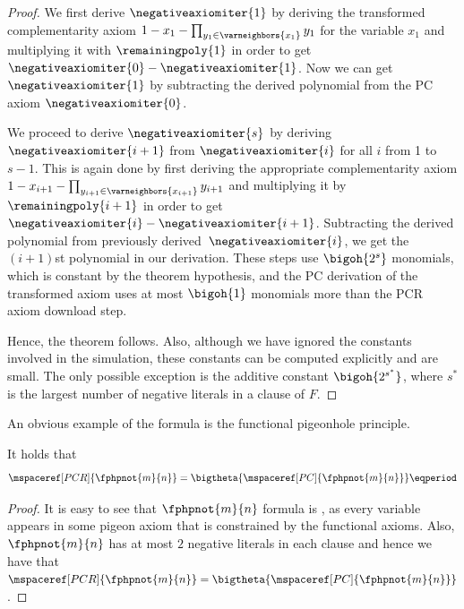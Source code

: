 \documentclass{toc}
\begin{document}
\begin{proof}
  We first derive $\negativeaxiomiter{1}$ by deriving the transformed
  complementarity axiom $1 - x_1 - \prod_{y_1 \in \varneighbors{x_1}}
  y_1$ for the variable $x_1$ and multiplying it with
  $\remainingpoly{1}$ in order to get
  $\negativeaxiomiter{0} - \negativeaxiomiter{1}$. Now we can get
  $\negativeaxiomiter{1}$ by subtracting the derived polynomial from
  the PC axiom $\negativeaxiomiter{0}$.


  We proceed to derive $\negativeaxiomiter{s}$ by deriving
  $\negativeaxiomiter{i + 1}$ from $\negativeaxiomiter{i}$ for all $i$
  from 1 to $s - 1$. This is again done by first deriving the
  appropriate complementarity axiom $1 - x_{i + 1} - \prod_{y_{i + 1}
    \in \varneighbors{x_{i + 1}}} y_{i + 1}$ and multiplying it by
  $\remainingpoly{i + 1}$ in order to get
  $\negativeaxiomiter{i} - \negativeaxiomiter{i + 1}$. Subtracting the
  derived polynomial from previously derived~$\negativeaxiomiter{i}$,
  we get the $(i + 1)$st polynomial in our derivation. These steps use
  $\bigoh{2^{s}}$ monomials, which is constant by the theorem hypothesis,
  and the PC derivation of the transformed axiom uses at most
  $\bigoh{1}$ monomials more than the PCR axiom download step.

  Hence, the theorem follows. Also, although we have ignored the
  constants involved in the simulation, these constants can be
  computed explicitly and are small. The only possible exception is
  the additive constant $\bigoh{2^{s^{*}}}$, where $s^{*}$ is the
  largest number of negative literals in a clause of $F$.
\end{proof}

An obvious example of the \varweightconstrained{} formula is the
functional pigeonhole principle.

\begin{corollary}\label{cor:fphppcequalpcrspace}
  It holds that
  \begin{equation*}
    \mspaceref[PCR]{\fphpnot{m}{n}} = \bigtheta{\mspaceref[PC]{\fphpnot{m}{n}}} \eqperiod
  \end{equation*}
\end{corollary}
\begin{proof}
  It is easy to see that $\fphpnot{m}{n}$ formula is
  \varweightconstrained{}, as every variable appears in some pigeon
  axiom that is constrained by the functional axioms. Also,
  $\fphpnot{m}{n}$ has at most $2$ negative literals in each clause
  and hence we have that $\mspaceref[PCR]{\fphpnot{m}{n}} =
  \bigtheta{\mspaceref[PC]{\fphpnot{m}{n}}}$.
\end{proof}
\end{document}
